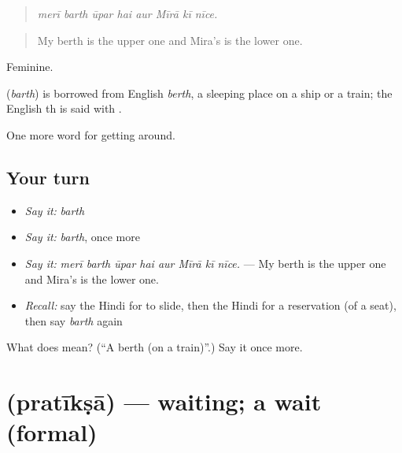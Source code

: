 \begin{quote}
       
\end{quote}

\begin{quote}
\emph{merī barth ūpar hai aur Mīrā kī nīce.}
\end{quote}

\begin{quote}
My berth is the upper one and Mira's is the lower one.
\end{quote}

Feminine.

\begin{cousinweb}
\textbf{} (\emph{barth}) is borrowed from English \emph{berth}, a sleeping place on a ship or a train; the English th is said with .
\end{cousinweb}

\begin{grammarlens}[title={What you've built}]
One more word for getting around.
\end{grammarlens}

\subsection*{Your turn}
\begin{itemize}
\raggedright
  \item \emph{Say it:} \emph{barth}
  \item \emph{Say it:} \emph{barth}, once more
  \item \emph{Say it:} \emph{merī barth ūpar hai aur Mīrā kī nīce.} — My berth is the upper one and Mira's is the lower one.
  \item \emph{Recall:} say the Hindi for to slide, then the Hindi for a reservation (of a seat), then say \emph{barth} again
\end{itemize}

\begin{tcolorbox}[breakable,colback=teal!4,colframe=teal!35!black,title={Before you move on}]
What does  mean? (\textquotedblleft{}A berth (on a train)\textquotedblright{}.) Say it once more.
\end{tcolorbox}
\section[\texorpdfstring{\hi{प्रतीक्षा} (pratīkṣā)}{प्रतीक्षा (pratīkṣā)}]{ (pratīkṣā) — waiting; a wait (formal)}

